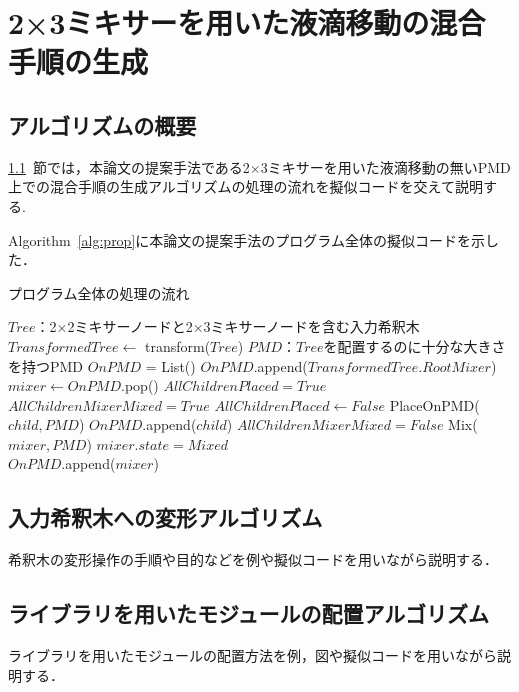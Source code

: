 \chapter{{2×3ミキサーを用いた液滴移動の混合手順の生成}}
\section{アルゴリズムの概要}
\label{overview}
\ref{overview}~節では，本論文の提案手法である2$\times$3ミキサーを用いた液滴移動の無いPMD上での混合手順の生成アルゴリズムの処理の流れを擬似コードを交えて説明する.

Algorithm~\ref{alg:prop}に本論文の提案手法のプログラム全体の擬似コードを示した．
\begin{algorithm}[tbp]
 \caption{プログラム全体の処理の流れ}\label{alg:prop}
 \begin{algorithmic}[1]
    \Require $\mathit{Tree}$：2$\times$2ミキサーノードと2$\times$3ミキサーノードを含む入力希釈木
     \State $TransformedTree \gets$ transform($Tree$) 
     \Require $\mathit{PMD}$：$\mathit{Tree}$を配置するのに十分な大きさを持つPMD  
     \State $\mathit{OnPMD}$ = List() 
     \State $\mathit{OnPMD}$.append($TransformedTree.RootMixer$)
    \State {}
        $\mathit{mixer} \gets  \mathit{OnPMD}$.pop()
        \State $\mathit{AllChildrenPlaced}=\mathit{True}$
        \State $\mathit{AllChildrenMixerMixed}=\mathit{True}$
                $\mathit{AllChildrenPlaced \gets False}$
                \State PlaceOnPMD($\mathit{child,PMD}$)
                \State $\mathit{OnPMD}$.append($\mathit{child}$) 
            \EndIf 
                \State $\mathit{AllChildrenMixerMixed}=\mathit{False}$
            \EndIf 
        \EndFor 
            Mix($\mathit{mixer,PMD}$)
            $\mathit{mixer.state} = \mathit{Mixed}$ \\
            $\mathit{OnPMD}$.append($\mathit{mixer}$)
        \EndIf
    \EndWhile 




 \end{algorithmic}
\end{algorithm}
\section{入力希釈木への変形アルゴリズム}
希釈木の変形操作の手順や目的などを例や擬似コードを用いながら説明する．
\section{ライブラリを用いたモジュールの配置{アルゴリズム}}
ライブラリを用いたモジュールの配置方法を例，図や擬似コードを用いながら説明する．
